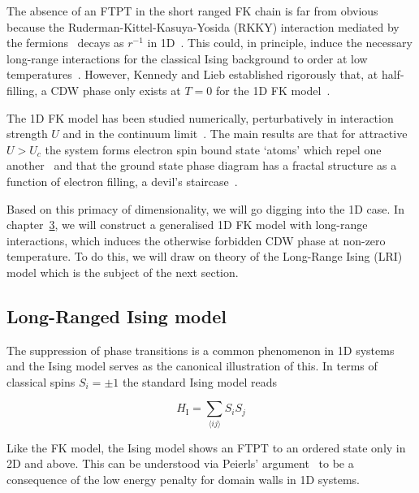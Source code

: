 The absence of an FTPT in the short ranged FK chain is far from obvious because the Ruderman-Kittel-Kasuya-Yosida (RKKY) interaction mediated by the fermions~\autocite{kasuyaTheoryMetallicFerro1956,rudermanIndirectExchangeCoupling1954,vanvleckNoteInteractionsSpins1962,yosidaMagneticPropertiesCuMn1957} decays as \(r^{-1}\) in 1D~\autocite{rusinCalculationRKKYRange2017}. This could, in principle, induce the necessary long-range interactions for the classical Ising background to order at low temperatures~\autocite{thoulessLongRangeOrderOneDimensional1969,peierlsIsingModelFerromagnetism1936}. However, Kennedy and Lieb established rigorously that, at half-filling, a CDW phase only exists at \(T = 0\) for the 1D FK model~\autocite{kennedyItinerantElectronModel1986}.

The 1D FK model has been studied numerically, perturbatively in interaction strength \(U\) and in the continuum limit~\autocite{bursillOneDimensionalContinuum1994}. The main results are that for attractive \(U > U_c\) the system forms electron spin bound state `atoms' which repel one another~\autocite{gruberGroundStateEnergyLowTemperature1993} and that the ground state phase diagram has a fractal structure as a function of electron filling, a devil's staircase~\autocite{freericksTwostateOnedimensionalSpinless1990,michelettiCompleteDevilStaircase1997}.

Based on this primacy of dimensionality, we will go digging into the 1D case. In chapter~\protect\hyperlink{chap:3-the-long-range-falicov-kimball-model}{3}, we will construct a generalised 1D FK model with long-range interactions, which induces the otherwise forbidden CDW phase at non-zero temperature. To do this, we will draw on theory of the Long-Range Ising (LRI) model which is the subject of the next section.

\hypertarget{long-ranged-ising-model}{%
\subsection{Long-Ranged Ising model}\label{long-ranged-ising-model}}

The suppression of phase transitions is a common phenomenon in 1D systems and the Ising model serves as the canonical illustration of this. In terms of classical spins \(S_i = \pm 1\) the standard Ising model reads

\[H_{\mathrm{I}} = \sum_{\langle ij \rangle} S_i S_j\]

Like the FK model, the Ising model shows an FTPT to an ordered state only in 2D and above. This can be understood via Peierls' argument~\autocite{peierlsIsingModelFerromagnetism1936,kennedyItinerantElectronModel1986} to be a consequence of the low energy penalty for domain walls in 1D systems.

